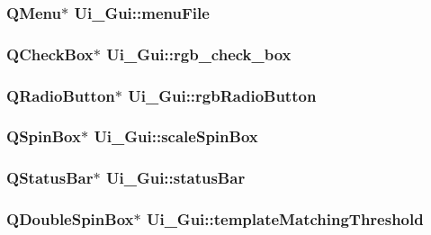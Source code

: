 \label{classUi__Gui_a52e0cfb41876e30e704cc59c5f143afa}
\hypertarget{classUi__Gui_a9b6ca26e1c5b8018a71df8e7cb4a385c}{
\subsubsection[{menuFile}]{\setlength{\rightskip}{0pt plus 5cm}QMenu$\ast$ {\bf Ui\_\-Gui::menuFile}}}
\label{classUi__Gui_a9b6ca26e1c5b8018a71df8e7cb4a385c}
\hypertarget{classUi__Gui_a7966c402c7480aea21beefdedb9ff975}{
\subsubsection[{rgb\_\-check\_\-box}]{\setlength{\rightskip}{0pt plus 5cm}QCheckBox$\ast$ {\bf Ui\_\-Gui::rgb\_\-check\_\-box}}}
\label{classUi__Gui_a7966c402c7480aea21beefdedb9ff975}
\hypertarget{classUi__Gui_a4f5eedc4bd54e2bede4a49f492ed1002}{
\subsubsection[{rgbRadioButton}]{\setlength{\rightskip}{0pt plus 5cm}QRadioButton$\ast$ {\bf Ui\_\-Gui::rgbRadioButton}}}
\label{classUi__Gui_a4f5eedc4bd54e2bede4a49f492ed1002}
\hypertarget{classUi__Gui_a957da99b260b0e8c5821cac9920ecf22}{
\subsubsection[{scaleSpinBox}]{\setlength{\rightskip}{0pt plus 5cm}QSpinBox$\ast$ {\bf Ui\_\-Gui::scaleSpinBox}}}
\label{classUi__Gui_a957da99b260b0e8c5821cac9920ecf22}
\hypertarget{classUi__Gui_ac8814dd3cd1e3d421e0d027f048aa8ef}{
\subsubsection[{statusBar}]{\setlength{\rightskip}{0pt plus 5cm}QStatusBar$\ast$ {\bf Ui\_\-Gui::statusBar}}}
\label{classUi__Gui_ac8814dd3cd1e3d421e0d027f048aa8ef}
\hypertarget{classUi__Gui_a392eecf3d4394e8429553c262c0efea0}{
\subsubsection[{templateMatchingThreshold}]{\setlength{\rightskip}{0pt plus 5cm}QDoubleSpinBox$\ast$ {\bf Ui\_\-Gui::templateMatchingThreshold}}}
